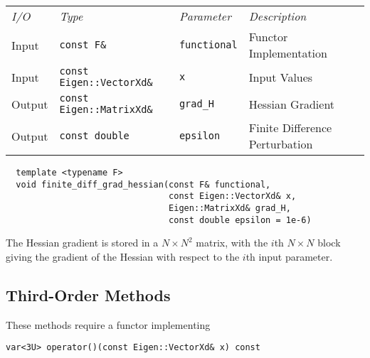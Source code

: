 \begin{tcolorbox}[colback=white,colframe=gray90, coltitle=black,boxrule=3pt,
fonttitle=\bfseries,title=Finite Difference Hessian Gradient]

\begin{tabular}{llll}
\textit{I/O} & \textit{Type} & \textit{Parameter} & \textit{Description} \\
Input & \texttt{const F\&} & \texttt{functional} & Functor Implementation \\
Input & \texttt{const Eigen::VectorXd\&} & \texttt{x} & Input Values \\
Output & \texttt{const Eigen::MatrixXd\&} & \texttt{grad\_H} & Hessian Gradient \\
Output & \texttt{const double} & \texttt{epsilon} & Finite Difference Perturbation
\end{tabular}

\vspace{5mm}

\begin{verbatim}
  template <typename F>
  void finite_diff_grad_hessian(const F& functional,
                                const Eigen::VectorXd& x,
                                Eigen::MatrixXd& grad_H,
                                const double epsilon = 1e-6)
\end{verbatim}

\vspace{5mm}

The Hessian gradient is stored in a $N \times N^{2}$ matrix, with the $i$th
$N \times N$ block giving the gradient of the Hessian with respect to the
$i$th input parameter.

\end{tcolorbox}

\subsection{Third-Order Methods}

These methods require a functor implementing
%
\begin{verbatim}
var<3U> operator()(const Eigen::VectorXd& x) const
\end{verbatim}

